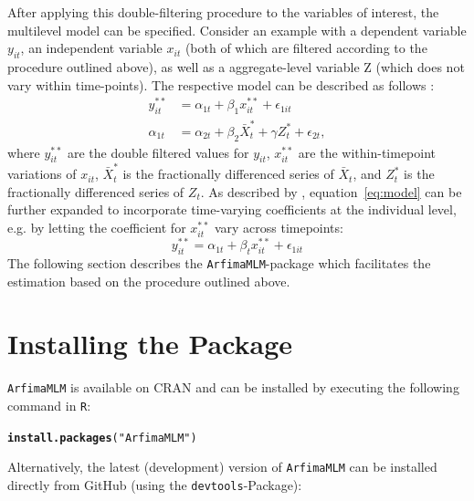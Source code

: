 \documentclass[12pt]{paper}\usepackage[]{graphicx}\usepackage[]{color}
\makeatletter
\newcommand{\hlstr}[1]{\textcolor[rgb]{0.192,0.494,0.8}{#1}}%
\newcommand{\hlstd}[1]{\textcolor[rgb]{0.345,0.345,0.345}{#1}}%
\newcommand{\hlkwd}[1]{\textcolor[rgb]{0.737,0.353,0.396}{\textbf{#1}}}%
\newenvironment{kframe}{%
 \def\at@end@of@kframe{}%
 \ifinner\ifhmode%
  \def\at@end@of@kframe{\end{minipage}}%
  \begin{minipage}{\columnwidth}%
 \fi\fi%
 \def\FrameCommand##1{\hskip\@totalleftmargin \hskip-\fboxsep
 \colorbox{shadecolor}{##1}\hskip-\fboxsep
     \hskip-\linewidth \hskip-\@totalleftmargin \hskip\columnwidth}%
 \MakeFramed {\advance\hsize-\width
   \@totalleftmargin\z@ \linewidth\hsize
   \@setminipage}}%
 {\par\unskip\endMakeFramed%
 \at@end@of@kframe}
\newenvironment{knitrout}{}{} %
\makeatother
\begin{document}
After applying this double-filtering procedure to the variables of interest, the multilevel model can be specified. Consider an example with a dependent variable $y_{it}$, an independent variable $x_{it}$ (both of which are filtered according to the procedure outlined above), as well as a aggregate-level variable Z (which does not vary within time-points). The respective model can be described as follows \citep{lebo2015effective}:
\begin{align}
y_{it}^{**}&=\alpha_{1t}+\beta_1 x_{it}^{**} + \epsilon_{1it} \label{eq:model}\\
\alpha_{1t}&=\alpha_{2t}+\beta_2 \bar{X}_{t}^{*} + \gamma Z_t^* + \epsilon_{2t},
\end{align}
where $y_{it}^{**}$ are the double filtered values for $y_{it}$, $x_{it}^{**}$ are the within-timepoint variations of $x_{it}$, $\bar{X}_{t}^{*}$ is the fractionally differenced series of $\bar{X}_t$, and $Z_t^*$ is the fractionally differenced series of $Z_t$. As described by \citet{lebo2015effective}, equation~\eqref{eq:model} can be further expanded to incorporate time-varying coefficients at the individual level, e.g. by letting the coefficient for $x_{it}^{**}$ vary across timepoints:
\begin{equation}
y_{it}^{**}=\alpha_{1t}+\beta_t x_{it}^{**} + \epsilon_{1it}
\end{equation}
The following section describes the \texttt{ArfimaMLM}-package which facilitates the estimation based on the procedure outlined above.


\section{Installing the Package}

\texttt{ArfimaMLM} is available on CRAN and can be installed by executing the following command in \texttt{R}:

\begin{knitrout}
\color{fgcolor}\begin{kframe}
\begin{alltt}
\hlkwd{install.packages}\hlstd{(}\hlstr{"ArfimaMLM"}\hlstd{)}
\end{alltt}
\end{kframe}
\end{knitrout}



\noindent Alternatively, the latest (development) version of \texttt{ArfimaMLM} can be installed directly from GitHub (using the \texttt{devtools}-Package):
\end{document}
